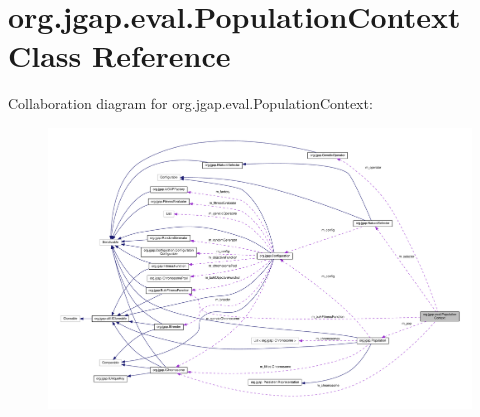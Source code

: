 \hypertarget{classorg_1_1jgap_1_1eval_1_1_population_context}{\section{org.\-jgap.\-eval.\-Population\-Context Class Reference}
\label{classorg_1_1jgap_1_1eval_1_1_population_context}
}


Collaboration diagram for org.\-jgap.\-eval.\-Population\-Context\-:
\nopagebreak
\begin{figure}[H]
\begin{center}
\leavevmode
\includegraphics[width=350pt]{classorg_1_1jgap_1_1eval_1_1_population_context__coll__graph}
\end{center}
\end{figure}
